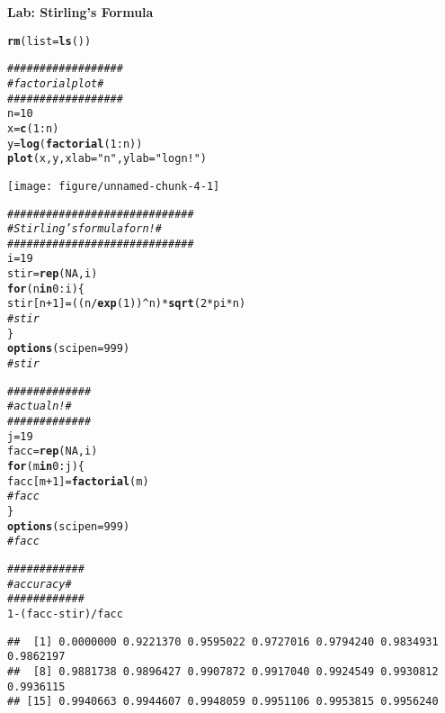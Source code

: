 \documentclass[12pt,oneside,english,american,flalign]{book}\usepackage[]{graphicx}\usepackage[]{color}
\makeatletter
\def\maxwidth{ %
  \ifdim\Gin@nat@width>\linewidth
    \linewidth
  \else
    \Gin@nat@width
  \fi
}
\newcommand{\hlnum}[1]{\textcolor[rgb]{0.686,0.059,0.569}{#1}}%
\newcommand{\hlstr}[1]{\textcolor[rgb]{0.192,0.494,0.8}{#1}}%
\newcommand{\hlcom}[1]{\textcolor[rgb]{0.678,0.584,0.686}{\textit{#1}}}%
\newcommand{\hlopt}[1]{\textcolor[rgb]{0,0,0}{#1}}%
\newcommand{\hlstd}[1]{\textcolor[rgb]{0.345,0.345,0.345}{#1}}%
\newcommand{\hlkwa}[1]{\textcolor[rgb]{0.161,0.373,0.58}{\textbf{#1}}}%
\newcommand{\hlkwb}[1]{\textcolor[rgb]{0.69,0.353,0.396}{#1}}%
\newcommand{\hlkwc}[1]{\textcolor[rgb]{0.333,0.667,0.333}{#1}}%
\newcommand{\hlkwd}[1]{\textcolor[rgb]{0.737,0.353,0.396}{\textbf{#1}}}%
\newenvironment{kframe}{%
 \def\at@end@of@kframe{}%
 \ifinner\ifhmode%
  \def\at@end@of@kframe{\end{minipage}}%
  \begin{minipage}{\columnwidth}%
 \fi\fi%
 \def\FrameCommand##1{\hskip\@totalleftmargin \hskip-\fboxsep
 \colorbox{shadecolor}{##1}\hskip-\fboxsep
     \hskip-\linewidth \hskip-\@totalleftmargin \hskip\columnwidth}%
 \MakeFramed {\advance\hsize-\width
   \@totalleftmargin\z@ \linewidth\hsize
   \@setminipage}}%
 {\par\unskip\endMakeFramed%
 \at@end@of@kframe}
\newenvironment{knitrout}{}{} %
\makeatother
\begin{document}
\noindent \textbf{Lab: Stirling's Formula}

\begin{doublespace}
\begin{knitrout}
\color{fgcolor}\begin{kframe}
\begin{alltt}
\hlkwd{rm}\hlstd{(}\hlkwc{list}\hlstd{=}\hlkwd{ls}\hlstd{())}

\hlcom{##################}
\hlcom{# factorial plot #}
\hlcom{##################}
\hlstd{n} \hlkwb{=} \hlnum{10}
\hlstd{x} \hlkwb{=} \hlkwd{c}\hlstd{(}\hlnum{1}\hlopt{:}\hlstd{n)}
\hlstd{y} \hlkwb{=} \hlkwd{log}\hlstd{(}\hlkwd{factorial}\hlstd{(}\hlnum{1}\hlopt{:}\hlstd{n))}
\hlkwd{plot}\hlstd{(x, y,} \hlkwc{xlab}\hlstd{=}\hlstr{"n"}\hlstd{,} \hlkwc{ylab}\hlstd{=}\hlstr{"log n!"}\hlstd{)}
\end{alltt}
\end{kframe}
\texttt{[image: figure/unnamed-chunk-4-1]} 
\begin{kframe}\begin{alltt}
\hlcom{#############################}
\hlcom{# Stirling's formula for n! #}
\hlcom{#############################}
\hlstd{i} \hlkwb{=} \hlnum{19}
\hlstd{stir} \hlkwb{=} \hlkwd{rep}\hlstd{(}\hlnum{NA}\hlstd{, i)}
\hlkwa{for} \hlstd{(n} \hlkwa{in} \hlnum{0}\hlopt{:}\hlstd{i)\{}
    \hlstd{stir[n}\hlopt{+}\hlnum{1}\hlstd{]} \hlkwb{=} \hlstd{((n}\hlopt{/}\hlkwd{exp}\hlstd{(}\hlnum{1}\hlstd{))}\hlopt{^}\hlstd{n)}\hlopt{*}\hlkwd{sqrt}\hlstd{(}\hlnum{2}\hlopt{*}\hlstd{pi}\hlopt{*}\hlstd{n)}
    \hlcom{#stir}
\hlstd{\}}
\hlkwd{options}\hlstd{(}\hlkwc{scipen}\hlstd{=}\hlnum{999}\hlstd{)}
\hlcom{#stir}

\hlcom{#############}
\hlcom{# actual n! #}
\hlcom{#############}
\hlstd{j} \hlkwb{=} \hlnum{19}
\hlstd{facc} \hlkwb{=} \hlkwd{rep}\hlstd{(}\hlnum{NA}\hlstd{, i)}
\hlkwa{for} \hlstd{(m} \hlkwa{in} \hlnum{0}\hlopt{:}\hlstd{j)\{}
    \hlstd{facc[m}\hlopt{+}\hlnum{1}\hlstd{]} \hlkwb{=} \hlkwd{factorial}\hlstd{(m)}
    \hlcom{#facc}
\hlstd{\}}
\hlkwd{options}\hlstd{(}\hlkwc{scipen}\hlstd{=}\hlnum{999}\hlstd{)}
\hlcom{#facc}

\hlcom{############}
\hlcom{# accuracy #}
\hlcom{############}
\hlnum{1} \hlopt{-} \hlstd{(facc}\hlopt{-}\hlstd{stir)}\hlopt{/}\hlstd{facc}
\end{alltt}
\begin{verbatim}
##  [1] 0.0000000 0.9221370 0.9595022 0.9727016 0.9794240 0.9834931 0.9862197
##  [8] 0.9881738 0.9896427 0.9907872 0.9917040 0.9924549 0.9930812 0.9936115
## [15] 0.9940663 0.9944607 0.9948059 0.9951106 0.9953815 0.9956240
\end{verbatim}
\end{kframe}
\end{knitrout}
\end{doublespace}
\end{document}
